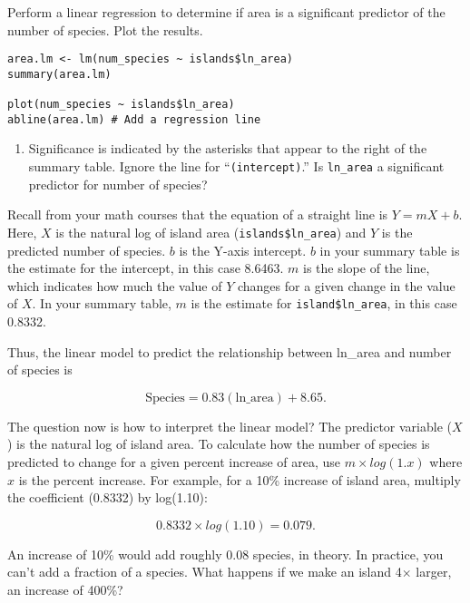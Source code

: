 \documentclass[11pt]{article}
\begin{document}
Perform a linear regression to determine if area is a significant predictor of the number of species. Plot the results.

\begin{verbatim}
area.lm <- lm(num_species ~ islands$ln_area)
summary(area.lm)

plot(num_species ~ islands$ln_area)
abline(area.lm) # Add a regression line
\end{verbatim}



\begin{enumerate}[resume]
\item Significance is indicated by the asterisks that appear to the right of the summary table. Ignore the line for “\texttt{(intercept)}.” Is \texttt{ln\_area} a significant predictor for number of species?
\end{enumerate}


\newpage

Recall from your math courses that the equation of a straight line is $Y = mX + b$. Here, $X$ is the natural log of island area (\texttt{islands\$ln\_area}) and $Y$ is the predicted number of species. $b$ is the Y-axis intercept. $b$ in your summary table is the estimate for the intercept, in this case 8.6463. $m$ is the slope of the line, which indicates how much the value of $Y$ changes for a given change in the value of $X$. In your summary table, $m$ is the estimate for \texttt{island\$ln\_area}, in this case 0.8332.

Thus, the linear model to predict the relationship between ln\_area and number of species is

\[ \mathrm{Species} = 0.83\left(\mathrm{ln\_area}\right) + 8.65.\]

The question now is how to interpret the linear model? The predictor variable ($X$) is the natural log of island area. To calculate how the number of species is predicted to change for a given percent increase of area, use $m \times log(1.x)$ where $x$ is the percent increase. For example, for a 10\% increase of island area, multiply the coefficient (0.8332) by log(1.10):
 
 \[ 0.8332 \times log(1.10) = 0.079.\]
 
An increase of 10\% would add roughly 0.08 species, in theory. In practice, you can't add a fraction of a species. What happens if we make an island 4$\times$ larger, an increase of 400\%? 
 
\end{document}
